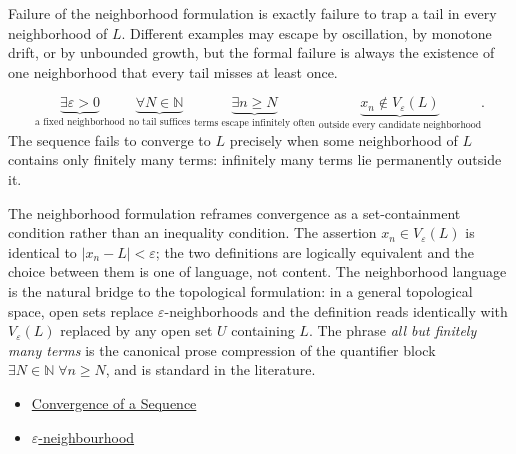\begin{remark*}
Failure of the neighborhood formulation is exactly failure to trap a
tail in every neighborhood of $L$. Different examples may escape by
oscillation, by monotone drift, or by unbounded growth, but the formal
failure is always the existence of one neighborhood that every tail
misses at least once.
\end{remark*}

\begin{remark*}
\[
\underbrace{\exists \varepsilon > 0}_{\text{a fixed neighborhood}}
\;\underbrace{\forall N \in \mathbb{N}}_{\text{no tail suffices}}
\;\underbrace{\exists n \ge N}_{\text{terms escape infinitely often}}
\;\underbrace{x_n \notin V_\varepsilon(L)}_{\text{outside every candidate neighborhood}}.
\]
The sequence fails to converge to $L$ precisely when some neighborhood
of $L$ contains only finitely many terms: infinitely many terms lie
permanently outside it.
\end{remark*}

\begin{remark*}[Interpretation]
The neighborhood formulation reframes convergence as a set-containment
condition rather than an inequality condition. The assertion $x_n \in
V_\varepsilon(L)$ is identical to $|x_n - L| < \varepsilon$; the two
definitions are logically equivalent and the choice between them is one
of language, not content. The neighborhood language is the natural
bridge to the topological formulation: in a general topological space,
open sets replace $\varepsilon$-neighborhoods and the definition reads
identically with $V_\varepsilon(L)$ replaced by any open set $U$
containing $L$. The phrase \emph{all but finitely many terms} is the
canonical prose compression of the quantifier block $\exists N \in
\mathbb{N} \;\forall n \ge N$, and is standard in the literature.
\end{remark*}

\begin{dependencies}
\begin{itemize}
  \item \hyperref[def:convergent-sequence]{Convergence of a Sequence}
  \item \hyperref[def:epsilon-neighbourhood]{$\varepsilon$-neighbourhood}
\end{itemize}
\end{dependencies}










